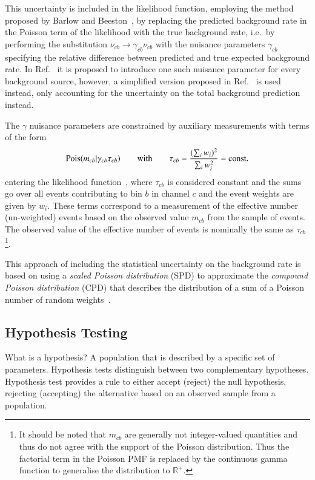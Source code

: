 This uncertainty is included in the likelihood function, employing the
method proposed by Barlow and Beeston~\cite{barlow1993}, by replacing
the predicted background rate in the Poisson term of the likelihood
with the true background rate, i.e.\ by performing the substitution
$\nu_{cb} \rightarrow \gamma_{cb} \nu_{cb}$ with the nuisance
parameters $\gamma_{cb}$ specifying the relative difference between
predicted and true expected background rate. In Ref.~\cite{barlow1993}
it is proposed to introduce one such nuisance parameter for every
background source, however, a simplified version proposed in
Ref.~\cite{conway2011} is used instead, only accounting for the
uncertainty on the total background prediction instead.

The $\gamma$ nuisance parameters are constrained by auxiliary
measurements with terms of the form
\begin{align*}
  \operatorname{Pois}(m_{cb} | \gamma_{cb} \tau_{cb})
  \qquad \text{with} \qquad
  \tau_{cb} = \frac{( \sum_i w_i )^2}{\sum_i w_i^2} = \text{const.}
\end{align*}
entering the likelihood function~\cite{cranmer2012}, where $\tau_{cb}$
is considered constant and the sums go over all events contributing to
bin $b$ in channel $c$ and the event weights are given by $w_i$. These
terms correspond to a measurement of the effective number
(un-weighted) events based on the observed value $m_{cb}$ from the
sample of events. The observed value of the effective number of events
is nominally the same as $\tau_{cb}$\footnote{It should be noted that
  $m_{cb}$ are generally not integer-valued quantities and thus do not
  agree with the support of the Poisson distribution. Thus the
  factorial term in the Poisson PMF is replaced by the continuous
  gamma function to generalise the distribution to $\mathbb{R}^+$.}.

This approach of including the statistical uncertainty on the
background rate is based on using a \emph{scaled Poisson distribution}
(SPD) to approximate the \emph{compound Poisson distribution} (CPD)
that describes the distribution of a sum of a Poisson number of random
weights~\cite{Bohm:2013gla}.


\subsection{Hypothesis Testing}
\label{sec:hypothesis_testing}

What is a hypothesis? A population that is described by a specific set
of parameters. Hypothesis tests distinguish between two complementary
hypotheses. Hypothesis test provides a rule to either accept (reject)
the null hypothesis, rejecting (accepting) the alternative based on an
observed sample from a population.


